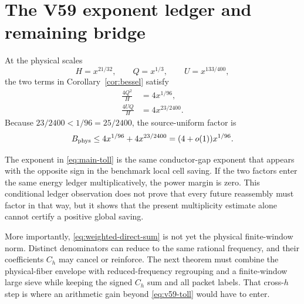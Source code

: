 \section{The V59 exponent ledger and remaining bridge}

At the physical scales
\[
 H=x^{21/32},\qquad Q=x^{1/3},\qquad U=x^{133/400},
\]
the two terms in Corollary~\ref{cor:bessel} satisfy
\begin{align}
 \frac{4Q^2}{H}&=4x^{1/96},\label{eq:main-toll}\\
 \frac{4UQ}{H}&=4x^{23/2400}.
\end{align}
Because $23/2400<1/96=25/2400$, the source-uniform factor is
\begin{equation}
 B_{\rm phys}\le4x^{1/96}+4x^{23/2400}
 =(4+o(1))x^{1/96}.                                   \label{eq:v59-toll}
\end{equation}

The exponent in \eqref{eq:main-toll} is the same conductor-gap exponent that appears
with the opposite sign in the benchmark local cell saving.  If the two factors enter
the same energy ledger multiplicatively, the power margin is zero.  This conditional
ledger observation does not prove that every future reassembly must factor in that
way, but it shows that the present multiplicity estimate alone cannot certify a
positive global saving.

More importantly, \eqref{eq:weighted-direct-sum} is not yet the physical finite-window
norm.  Distinct denominators can reduce to the same rational frequency, and their
coefficients $C_h$ may cancel or reinforce.  The next theorem must combine the
physical-fiber envelope with reduced-frequency regrouping and a finite-window large
sieve while keeping the signed $C_h$ sum and all packet labels.  That cross-$h$ step is
where an arithmetic gain beyond \eqref{eq:v59-toll} would have to enter.
